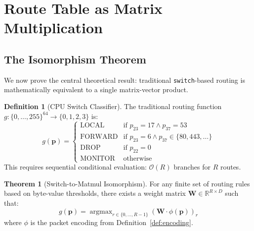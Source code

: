 \documentclass[11pt,a4paper,twoside]{article}
\theoremstyle{definition}
\newtheorem{definition}{Definition}[section]
\newtheorem{theorem}{Theorem}[section]
\theoremstyle{remark}
\newcommand{\BigO}{\mathcal{O}}
\newcommand{\R}{\mathbb{R}}
\newcommand{\argmax}{\operatorname{argmax}}
\newcommand{\mat}[1]{\mathbf{#1}}
\newcommand{\vect}[1]{\mathbf{#1}}
\begin{document}
\section{Route Table as Matrix Multiplication}
\label{sec:route-table}

\subsection{The Isomorphism Theorem}

We now prove the central theoretical result: traditional \texttt{switch}-based routing is mathematically equivalent to a single matrix-vector product.

\begin{definition}[CPU Switch Classifier]
\label{def:switch}
The traditional routing function $g: \{0,\ldots,255\}^{64} \to \{0,1,2,3\}$ is:
\begin{equation}
g(\vect{p}) = \begin{cases}
\text{LOCAL} & \text{if } p_{23} = 17 \wedge p_{37} = 53 \\
\text{FORWARD} & \text{if } p_{23} = 6 \wedge p_{37} \in \{80, 443, \ldots\} \\
\text{DROP} & \text{if } p_{22} = 0 \\
\text{MONITOR} & \text{otherwise}
\end{cases}
\end{equation}
This requires sequential conditional evaluation: $\BigO(R)$ branches for $R$ routes.
\end{definition}

\begin{theorem}[Switch-to-Matmul Isomorphism]
\label{thm:switch-matmul}
For any finite set of routing rules based on byte-value thresholds, there exists a weight matrix $\mat{W} \in \R^{R \times D}$ such that:
\begin{equation}
g(\vect{p}) = \argmax_{r \in \{0,\ldots,R-1\}} (\mat{W} \cdot \phi(\vect{p}))_r
\end{equation}
where $\phi$ is the packet encoding from Definition~\ref{def:encoding}.
\end{theorem}
\end{document}
